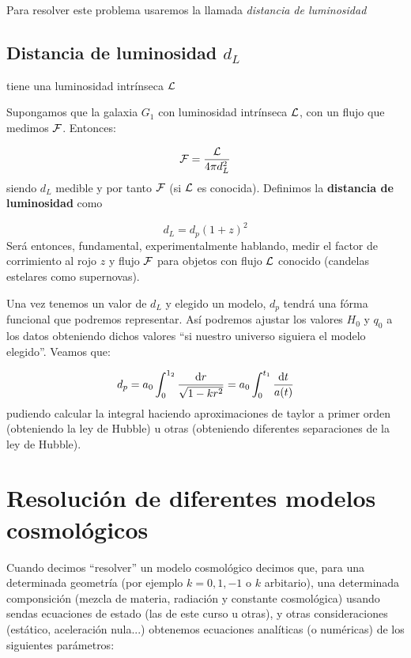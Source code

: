 Para resolver este problema usaremos la llamada \textit{distancia de luminosidad}

\subsection{Distancia de luminosidad $d_L$}tiene una luminosidad intrínseca $\mathcal{L}$

Supongamos que la galaxia $G_1$ con luminosidad intrínseca $\mathcal{L}$, con un flujo que medimos $\mathcal{F}$. Entonces:

\begin{equation}
	\mathcal{F} = \frac{\mathcal{L}}{4\pi d_L^2}
\end{equation}
siendo $d_L$ medible y por tanto $\mathcal{F}$ (si $\mathcal{L}$ es conocida). Definimos la \textbf{distancia de luminosidad} como

\begin{equation}
	d_L = d_p (1+z)^2
\end{equation}
Será entonces, fundamental, experimentalmente hablando, medir el factor de corrimiento al rojo $z$ y flujo $\mathcal{F}$ para objetos con flujo $\mathcal{L}$ conocido (candelas estelares como supernovas).

Una vez tenemos un valor de $d_L$ y elegido un modelo, $d_p$ tendrá una fórma funcional que podremos representar. Así podremos ajustar los valores $H_0$ y $q_0$ a los datos obteniendo dichos valores ``si nuestro universo siguiera el  modelo elegido''. Veamos que:

\begin{equation*}
	d_p = a_0 \int_{0}^{1_2} \frac{\mathrm{d} r}{\sqrt{1 - k r^2}} = a_0 \int_0^{t_1} \frac{\mathrm{d} t}{a(t)}
\end{equation*}
pudiendo calcular la integral haciendo aproximaciones de taylor a primer orden (obteniendo la ley de Hubble) u otras (obteniendo diferentes separaciones de la ley de Hubble).

\section{Resolución de diferentes modelos cosmológicos}

Cuando decimos ``resolver'' un modelo cosmológico decimos que, para una determinada geometría (por ejemplo $k=0,1,-1$ o $k$ arbitario), una determinada componsición (mezcla de materia, radiación y constante cosmológica) usando sendas ecuaciones de estado (las de este curso u otras), y otras consideraciones (estático, aceleración nula...) obtenemos ecuaciones analíticas (o numéricas) de los siguientes parámetros:


